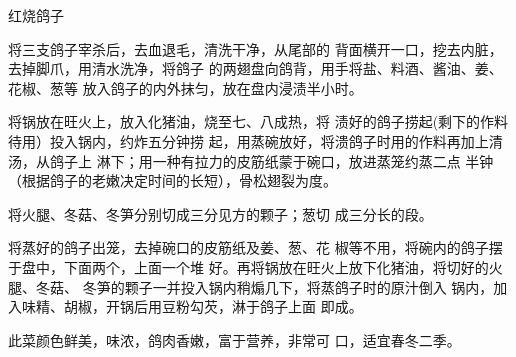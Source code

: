 \begin{recipe}{红烧鸽子}

\ingredients



\cooking

\step 将三支鸽子宰杀后，去血退毛，清洗干净，从尾部的 背面横开一口，挖去内脏，去掉脚爪，用清水洗净，将鸽子 的两翅盘向鸽背，用手将盐、料酒、酱油、姜、花椒、葱等 放入鸽子的内外抹匀，放在盘内浸渍半小时。

\step 将锅放在旺火上，放入化猪油，烧至七、八成热，将 渍好的鸽子捞起(剩下的作料待用）投入锅内，约炸五分钟捞 起，用蒸碗放好，将溃鸽子时用的作料再加上清汤，从鸽子上 淋下；用一种有拉力的皮筋纸蒙于碗口，放进蒸笼约蒸二点 半钟（根据鸽子的老嫩决定时间的长短），骨松翅裂为度。

\step 将火腿、冬菇、冬笋分别切成三分见方的颗子；葱切 成三分长的段。

将蒸好的鸽子出笼，去掉碗口的皮筋纸及姜、葱、花 椒等不用，将碗内的鸽子摆于盘中，下面两个，上面一个堆 好。再将锅放在旺火上放下化猪油，将切好的火腿、冬菇、 冬笋的颗子一并投入锅内稍煽几下，将蒸鸽子时的原汁倒入 锅内，加入味精、胡椒，开锅后用豆粉勾芡，淋于鸽子上面 即成。

\notes

此菜颜色鲜美，味浓，鸽肉香嫩，富于营养，非常可 口，适宜春冬二季。

\end{recipe}

